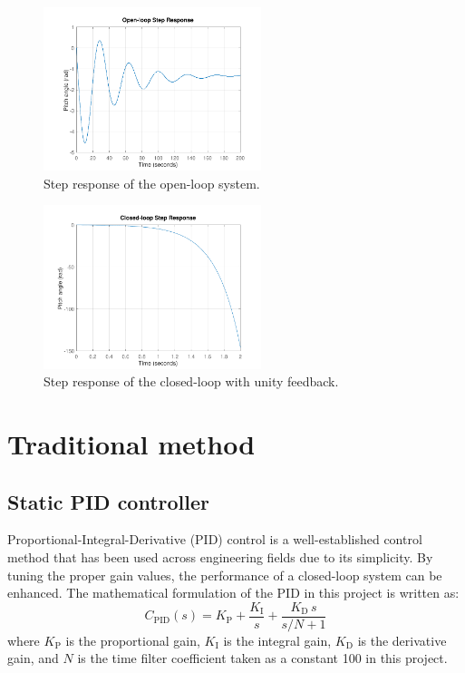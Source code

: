 \documentclass[lettersize,journal]{IEEEtran}
\begin{document}
\begin{figure}[!t]
\centering
\includegraphics[width=2.5in]{figs/open_loop_step_response.pdf}
\caption{Step response of the open-loop system.}
\label{fig:ol_step}
\end{figure}

\begin{figure}[!t]
\centering
\includegraphics[width=2.5in]{figs/closed_loop_step_response.pdf}
\caption{Step response of the closed-loop with unity feedback.}
\label{fig:cl_step}
\end{figure}

\section{Traditional method}
\subsection{Static PID controller}
Proportional-Integral-Derivative (PID) control is a well-established control method that has been used across engineering fields due to its simplicity. By tuning the proper gain values, the performance of a closed-loop system can be enhanced. The mathematical formulation of the PID in this project is written as:
\begin{equation}
C_{\mathrm{PID}}(s) = K_{\mathrm{P}} + \frac{K_{\mathrm{I}}}{s} + \frac{K_{\mathrm{D}}\,s}{s/N+1}
\end{equation}
where $K_{\mathrm{P}}$ is the proportional gain, $K_{\mathrm{I}}$ is the integral gain, $K_{\mathrm{D}}$ is the derivative gain, and $N$ is the time filter coefficient taken as a constant 100 in this project.
\end{document}
